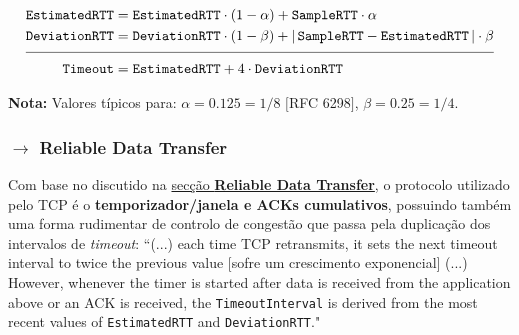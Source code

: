 \begin{mdframed}
    \vspace{-1.15 em}
    \begin{align*}
        \texttt{EstimatedRTT} &= \texttt{EstimatedRTT} \cdot (1 - \alpha) + \texttt{SampleRTT} \cdot \alpha \\
        \texttt{DeviationRTT} &= \texttt{DeviationRTT} \cdot (1 - \beta) + \left\vert\, \texttt{SampleRTT} - \texttt{EstimatedRTT}\, \right\vert \cdot \beta \\[-6pt] \cline{1-2}
        \texttt{Timeout} &= \texttt{EstimatedRTT} + 4 \cdot \texttt{DeviationRTT}
    \end{align*}
\end{mdframed}

\noindent \textbf{Nota:} Valores típicos para: $\alpha = 0.125 = 1/8$ $[$RFC 6298$]$, $\beta = 0.25 = 1/4$.

\renewcommand*{\thefootnote}{\fnsymbol{footnote}}
\renewcommand*{\thefootnote}{\arabic{footnote}}

\subsubsection[3.5.4 Reliable Data Transfer]{$\pmb{\rightarrow}$ Reliable Data Transfer}
 
 Com base no discutido na \hyperref[subsec:reliable-data-transfer]{secção \textbf{Reliable Data Transfer}}, o protocolo utilizado pelo TCP é o \textbf{temporizador/janela e ACKs cumulativos}, possuindo também uma forma rudimentar de controlo de congestão que passa pela duplicação dos intervalos de \textit{timeout}: ``(...) each time TCP retransmits, it sets the next timeout interval to twice the previous value $[$sofre um crescimento exponencial$]$ (...) However, whenever the timer is started after data is received from the application above or an ACK is received, the \texttt{TimeoutInterval} is derived from the most recent values of \texttt{EstimatedRTT} and \texttt{DeviationRTT}."\cite{Kurose2017}

